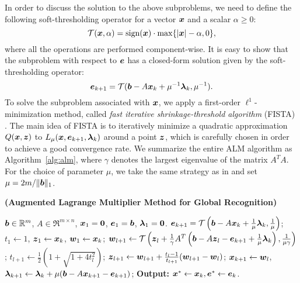 In order to discuss the solution to the above subproblems, we
need to define the following soft-thresholding operator for a
vector ${\boldsymbol{x}}$ and a scalar $\alpha \geq 0$:
\begin{equation}
\mathcal{T}({\boldsymbol{x}},\alpha) = \textup{sign}({\boldsymbol{x}})\cdot \max \{|{\boldsymbol{x}}| - \alpha, 0\},
\end{equation}
where all the operations are performed component-wise. It is
easy to show that the subproblem with respect to $\boldsymbol{e}$ has a
closed-form solution given by the soft-thresholding operator:
\begin{equation}
\boldsymbol{e}_{k+1} = \mathcal{T}(\boldsymbol{b} - A{\boldsymbol{x}}_k + \mu^{-1}\boldsymbol{\lambda}_k, \mu^{-1}).
\end{equation}
To solve the subproblem associated with ${\boldsymbol{x}}$, we
apply a first-order $\ell^1$-minimization method,
called \emph{fast iterative shrinkage-threshold algorithm}
(FISTA) \cite{BeckA2009}. The main idea of FISTA is to
iteratively minimize a quadratic approximation $Q({\boldsymbol{x}}, \boldsymbol{z})$ to
$L_{\mu} ({\boldsymbol{x}},\boldsymbol{e}_{k+1},\boldsymbol{\lambda}_k)$ around a point $\boldsymbol{z}$, which is
carefully chosen in order to achieve a good convergence
rate. We summarize the entire ALM
algorithm as Algorithm~\ref{alg:alm}, where $\gamma$ denotes the
largest eigenvalue of the matrix $A^TA$. For the choice of parameter $\mu$, we take the same strategy as
in \cite{YangJ2009-pp} and set $\mu = 2m / \|\boldsymbol{b}\|_1$.

\begin{algorithm}[t]
\caption{\bf (Augmented Lagrange Multiplier Method for Global
Recognition)}
\begin{algorithmic}[1]
\begin{small}
 $\boldsymbol{b} \in \mathbb R^m$, $A \in \Re^{m \times n}$,
${\boldsymbol{x}}_1 = \boldsymbol{0}$, $\boldsymbol{e}_1 = \boldsymbol{b}$, $\boldsymbol{\lambda}_1 =
\boldsymbol{0}$.
\STATE $\boldsymbol{e}_{k+1} = \mathcal{T}\left(\boldsymbol{b} - A{\boldsymbol{x}}_k +
\frac{1}{\mu}\boldsymbol{\lambda}_k, \frac{1}{\mu}\right)$;
\STATE $t_1\leftarrow 1$, $\boldsymbol{z}_1 \leftarrow {\boldsymbol{x}}_k$, $\boldsymbol{w}_1 \leftarrow {\boldsymbol{x}}_k$;
\STATE $\boldsymbol{w}_{l+1} \leftarrow \mathcal{T}\left(\boldsymbol{z}_l +
\frac{1}{\gamma}A^T\left(\boldsymbol{b} - A\boldsymbol{z}_l - \boldsymbol{e}_{k+1} +
\frac{1}{\mu}\boldsymbol{\lambda}_k\right), \frac{1}{\mu\gamma}\right)$;
\STATE $t_{l+1} \leftarrow \frac{1}{2}\left( 1 +
\sqrt{1+4t_l^2}\right)$;
\STATE $\boldsymbol{z}_{l+1} \leftarrow \boldsymbol{w}_{l+1} + \frac{t_l - 1}{t_{l+1}}(\boldsymbol{w}_{l+1} - \boldsymbol{w}_l)$;
\ENDWHILE
\STATE ${\boldsymbol{x}}_{k+1} \leftarrow \boldsymbol{w}_{l}$,  \; $\boldsymbol{\lambda}_{k+1} \leftarrow \boldsymbol{\lambda}_k + \mu (\boldsymbol{b} - A{\boldsymbol{x}}_{k+1} - \boldsymbol{e}_{k+1})$;
\ENDWHILE \STATE
{\bf Output:} ${\boldsymbol{x}}^* \leftarrow {\boldsymbol{x}}_k, \boldsymbol{e}^* \leftarrow \boldsymbol{e}_k$.
\end{small}
\end{algorithmic}
\label{alg:alm}
\end{algorithm}


